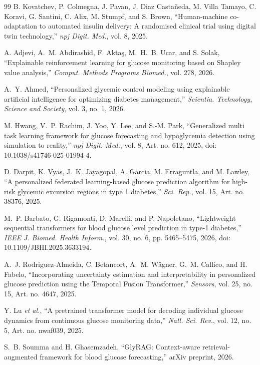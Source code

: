 \documentclass[journal]{IEEEtran}
\begin{document}
\begin{thebibliography}{99}
\label{ref18label} B. Kovatchev, P. Colmegna, J. Pavan, J. Diaz Casta\~neda, M. Villa Tamayo, C. Koravi, G. Santini, C. Alix, M. Stumpf, and S. Brown, ``Human-machine co-adaptation to automated insulin delivery: A randomised clinical trial using digital twin technology,'' \emph{npj Digit. Med.}, vol. 8, 2025.

\label{ref6label} A. Adjevi, A.~M. Abdirashid, F. Akta\c{s}, M.~H.~B. Ucar, and S. Solak, ``Explainable reinforcement learning for glucose monitoring based on Shapley value analysis,'' \emph{Comput. Methods Programs Biomed.}, vol. 278, 2026.

\label{ref7label} A.~Y. Ahmed, ``Personalized glycemic control modeling using explainable artificial intelligence for optimizing diabetes management,'' \emph{Scientia. Technology, Science and Society}, vol. 3, no. 1, 2026.

\label{ref15label} M. Hwang, V.~P. Rachim, J. Yoo, Y. Lee, and S.-M. Park, ``Generalized multi task learning framework for glucose forecasting and hypoglycemia detection using simulation to reality,'' \emph{npj Digit. Med.}, vol. 8, Art. no. 612, 2025, doi: 10.1038/s41746-025-01994-4.

\label{ref24label} D. Darpit, K. Vyas, J.~K. Jayagopal, A. Garcia, M. Erraguntla, and M. Lawley, ``A personalized federated learning-based glucose prediction algorithm for high-risk glycemic excursion regions in type 1 diabetes,'' \emph{Sci. Rep.}, vol. 15, Art. no. 38376, 2025.

\label{ref25label} M.~P. Barbato, G. Rigamonti, D. Marelli, and P. Napoletano, ``Lightweight sequential transformers for blood glucose level prediction in type-1 diabetes,'' \emph{IEEE J. Biomed. Health Inform.}, vol. 30, no. 6, pp. 5465--5475, 2026, doi: 10.1109/JBHI.2025.3633194.

\label{ref26label} A.~J. Rodriguez-Almeida, C. Betancort, A.~M. W\"agner, G.~M. Callico, and H. Fabelo, ``Incorporating uncertainty estimation and interpretability in personalized glucose prediction using the Temporal Fusion Transformer,'' \emph{Sensors}, vol. 25, no. 15, Art. no. 4647, 2025.

\label{ref27label} Y. Lu \emph{et al.}, ``A pretrained transformer model for decoding individual glucose dynamics from continuous glucose monitoring data,'' \emph{Natl. Sci. Rev.}, vol. 12, no. 5, Art. no. nwaf039, 2025.

\label{ref29label} S.~B. Soumma and H. Ghasemzadeh, ``GlyRAG: Context-aware retrieval-augmented framework for blood glucose forecasting,'' arXiv preprint, 2026.


\end{thebibliography}
\end{document}
